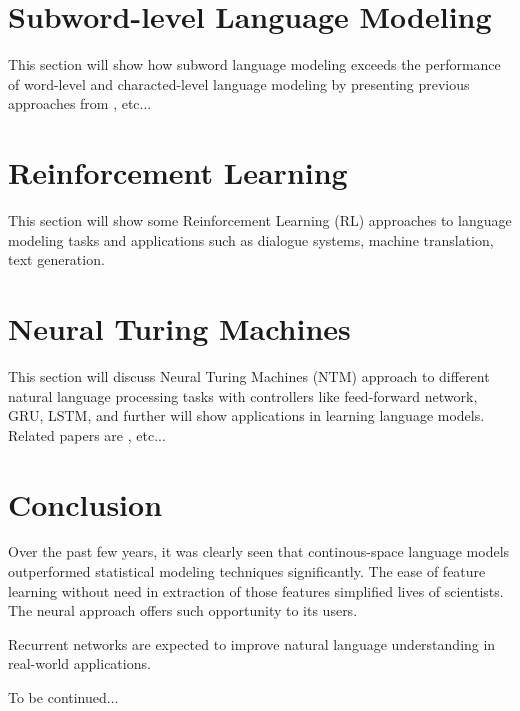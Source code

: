 \documentclass{IEEEtran}
\begin{document}
\section{Subword-level Language Modeling}

This section will show how subword language modeling exceeds the performance of word-level and characted-level language modeling by presenting previous approaches from \cite{Mikolov2011SubwordLM}, etc...

\section{Reinforcement Learning}

This section will show some Reinforcement Learning (RL) approaches to language modeling tasks and applications such as dialogue systems, machine translation, text generation.

\section{Neural Turing Machines}

This section will discuss Neural Turing Machines (NTM) approach to different natural language processing tasks with controllers like feed-forward network, GRU, LSTM, and further will show applications in learning language models. Related papers are \cite{snips16}, etc...

\section{Conclusion}

Over the past few years, it was clearly seen that continous-space language models outperformed statistical modeling techniques significantly. The ease of feature learning without need in extraction of those features simplified lives of scientists. The neural approach offers such opportunity to its users.

Recurrent networks are expected to improve natural language understanding in real-world applications.

To be continued...




\printbibliography
\end{document}

